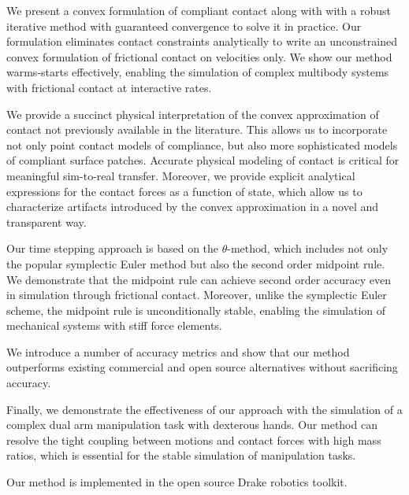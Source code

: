 We present a convex formulation of compliant contact along with with a robust
iterative method with guaranteed convergence to solve it in practice. Our
formulation eliminates contact constraints analytically to write an
unconstrained convex formulation of frictional contact on velocities only. We
show our method warms-starts effectively, enabling the simulation of complex
multibody systems with frictional contact at interactive rates. 

We provide a succinct physical interpretation of the convex approximation of
contact not previously available in the literature. This allows us to
incorporate not only point contact models of compliance, but also more
sophisticated models of compliant surface patches. Accurate physical modeling of
contact is critical for meaningful sim-to-real transfer. Moreover, we provide
explicit analytical expressions for the contact forces as a function of state,
which allow us to characterize artifacts introduced by the convex approximation
in a novel and transparent way. 

Our time stepping approach is based on the $\theta\text{-method}$, which
includes not only the popular symplectic Euler method but also the second order
midpoint rule. We demonstrate that the midpoint rule can achieve second order
accuracy even in simulation through frictional contact. Moreover, unlike the
symplectic Euler scheme, the midpoint rule is unconditionally stable, enabling
the simulation of mechanical systems with stiff force elements.

We introduce a number of accuracy metrics and show that our method outperforms
existing commercial and open source alternatives without sacrificing accuracy.

Finally, we demonstrate the effectiveness of our approach with the simulation of
a complex dual arm manipulation task with dexterous hands. Our method can
resolve the tight coupling between motions and contact forces with high mass
ratios, which is essential for the stable simulation of manipulation tasks.

Our method is implemented in the open source Drake robotics toolkit.

